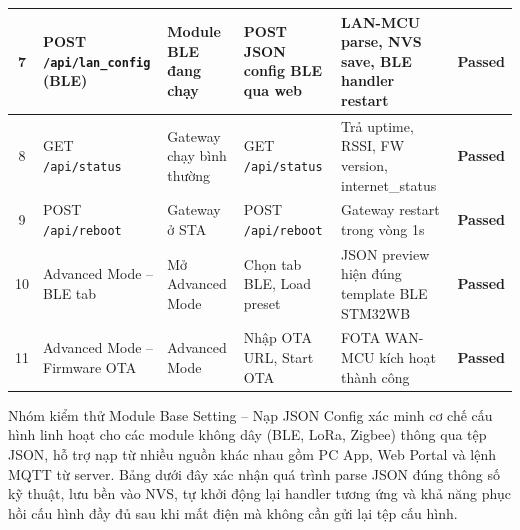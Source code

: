 \begin{longtable}{|c|p{3cm}|p{2cm}|p{4cm}|p{3cm}|c|}
            7 & POST \texttt{/api/lan\_config} (BLE) & Module BLE đang chạy & POST JSON config BLE qua web & LAN-MCU parse, NVS save, BLE handler restart & \textcolor{modern_blue}{\textbf{Passed}} \\ \hline

            8 & GET \texttt{/api/status} & Gateway chạy bình thường & GET \newline\texttt{/api/status} & Trả uptime, RSSI, FW version, internet\_status & \textcolor{modern_blue}{\textbf{Passed}} \\ \hline

            9 & POST \texttt{/api/reboot} & Gateway ở STA & POST \newline\texttt{/api/reboot} & Gateway restart trong vòng 1s & \textcolor{modern_blue}{\textbf{Passed}} \\ \hline

            10 & Advanced Mode -- BLE tab & Mở Advanced Mode & Chọn tab BLE, Load preset & JSON preview hiện đúng template BLE STM32WB & \textcolor{modern_blue}{\textbf{Passed}} \\ \hline

            11 & Advanced Mode -- Firmware OTA & Advanced Mode & Nhập OTA URL, Start OTA & FOTA WAN-MCU kích hoạt thành công & \textcolor{modern_blue}{\textbf{Passed}} \\ \hline
        \end{longtable}

        Nhóm kiểm thử Module Base Setting -- Nạp JSON Config xác minh cơ chế cấu hình linh hoạt cho các module không dây (BLE, LoRa, Zigbee) thông qua tệp JSON, hỗ trợ nạp từ nhiều nguồn khác nhau gồm PC App, Web Portal và lệnh MQTT từ server. Bảng dưới đây xác nhận quá trình parse JSON đúng thông số kỹ thuật, lưu bền vào NVS, tự khởi động lại handler tương ứng và khả năng phục hồi cấu hình đầy đủ sau khi mất điện mà không cần gửi lại tệp cấu hình.


